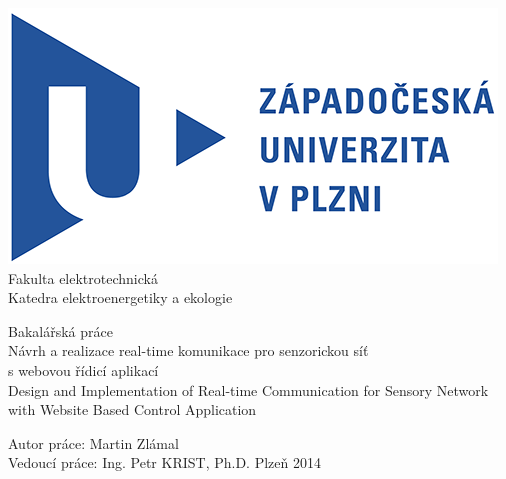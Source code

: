 \documentclass[oneside,12pt,a4paper,draft]{book} %
\begin{document}
\pagestyle{empty}
\begin{titlepage}
\noindent
\includegraphics[scale=1]{zcu.png} \\[0.3cm]
Fakulta elektrotechnická \\
Katedra elektroenergetiky a ekologie
\vspace{5cm}
\begin{center}
	{\Huge\sc Bakalářská práce} \\
	\vspace{1cm}
	{\large Návrh a realizace real-time komunikace pro senzorickou síť\\s webovou řídicí aplikací\\}
	\vspace{1cm}
	{\large Design and Implementation of Real-time Communication for Sensory Network with Website Based Control Application}
\end{center}
\vfill
Autor práce: Martin Zlámal\\
Vedoucí práce: Ing. Petr KRIST, Ph.D. \hfill Plzeň 2014
\end{titlepage}






%

\tableofcontents
\cleardoublepage
{}
{}
\listoffigures
\end{document}
